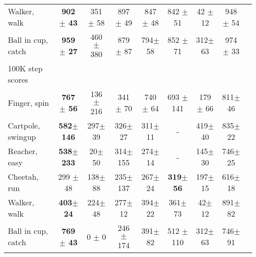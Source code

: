 \documentclass{article}
\begin{document}
\begin{table*}[ht]
\begin{center}
\begin{small}
\begin{sc}
\begin{tabular}{lcccccccc}
Walker, walk      & \textbf{902 $\pm$ 43}& 351 $\pm$ 58 & 897 $\pm$ 49 & 847 $\pm$ 48  & 842 $\pm$ 51 & 42 $\pm$ 12 & 948 $\pm$ 54 \\
Ball in cup, catch  & \textbf{959 $\pm$ 27} & 460 $\pm$  380 & 879 $\pm$  87 & 794$\pm$  58  &  852 $\pm$  71 & 312$ \pm$  63 & 974 $\pm$ 33\\
\midrule
100K step scores  &  &  &  &  &  &  &  \\
\midrule
Finger, spin    &  \textbf{767 $\pm$ 56 } & 136 $\pm$ 216 & 341 $\pm$ 70& 740 $\pm$ 64 &  693 $\pm$ 141 & 179 $\pm$ 66 &  811$\pm$46 \\
Cartpole, swingup & \textbf{582$\pm$146}& 297$\pm$39& 326$\pm$27 & 311$\pm$11 & - & 419$\pm$40 & 835$\pm$22\\
Reacher, easy    & \textbf{538$\pm$233} & 20$\pm$50 & 314$\pm$155 & 274$\pm$14 & - & 145$\pm$30 & 746$\pm$25 \\
Cheetah, run   & 299 $\pm$48 & 138$\pm$88& 235$\pm$ 137 & 267$\pm$24 &  \textbf{319$\pm$56} & 197$\pm$15& 616$\pm$18 \\
Walker, walk      & \textbf{403$\pm$24}&  224$\pm$48& 277$\pm$12 & 394$\pm$22 & 361$\pm$73 &42$\pm$12& 891$\pm$82 \\
Ball in cup, catch  & \textbf{769 $\pm$ 43} & 0 $\pm$  0 & 246 $\pm$ 174 & 391$\pm$ 82 & 512 $\pm$ 110 & 312$\pm$ 63 & 746$\pm$91 \\ 
\bottomrule
\end{tabular}
\end{sc}
\end{small}
\end{center}
\vskip -0.1in
\end{table*}
\end{document}

